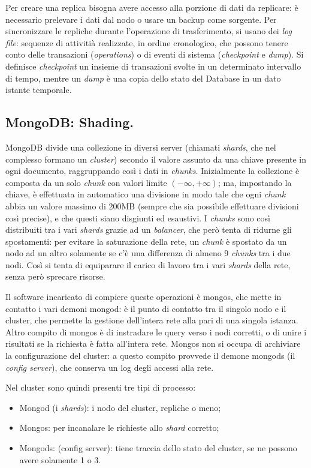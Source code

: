 \documentclass[a4page, 11pt]{article}
\begin{document}
Per creare una replica bisogna avere accesso alla porzione di dati da replicare: è necessario prelevare i dati dal nodo o usare un backup come sorgente.
Per sincronizzare le repliche durante l'operazione di trasferimento, si usano dei \textit{log file}: sequenze di attivitià realizzate, in ordine cronologico, che possono tenere conto delle transazioni (\textit{operations}) o di eventi di sistema (\textit{checkpoint} e \textit{dump}).
Si definisce \textit{checkpoint} un insieme di transazioni svolte in un determinato intervallo di tempo, mentre un \textit{dump} è una copia dello stato del Database in un dato istante temporale.

\subsection{MongoDB: Shading\cite{ScalingMongoDB}.}
MongoDB divide una collezione in diversi server (chiamati \textit{shards}, che nel complesso formano un \textit{cluster}) secondo il valore assunto da una chiave presente in ogni documento, raggruppando così i dati in \textit{chunks}.
Inizialmente la collezione è composta da un solo \textit{chunk} con valori limite $(-\infty, +\infty)$; ma, impostando la chiave, è effettuata in automatico una divisione in modo tale che ogni \textit{chunk} abbia un valore massimo di 200MB (sempre che sia possibile effettuare divisioni così precise), e che questi siano disgiunti ed esaustivi.
I \textit{chunks} sono così distribuiti tra i vari \textit{shards} grazie ad un \textit{balancer}, che però tenta di ridurne gli spostamenti: per evitare la saturazione della rete, un \textit{chunk} è spostato da un nodo ad un altro solamente se c'è una differenza di almeno 9 \textit{chunks} tra i due nodi.
Così si tenta di equiparare il carico di lavoro tra i vari \textit{shards} della rete, senza però sprecare risorse.

Il software incaricato di compiere queste operazioni è mongos, che mette in contatto i vari demoni mongod: è il punto di contatto tra il singolo nodo e il cluster, che permette la gestione dell'intera rete alla pari di una singola istanza.
Altro compito di mongos è di instradare le query verso i nodi corretti, o di unire i risultati se la richiesta è fatta all'intera rete.
Mongos non si occupa di archiviare la configurazione del cluster: a questo compito provvede il demone mongods (il \textit{config server}), che conserva un log degli accessi alla rete.

Nel cluster sono quindi presenti tre tipi di processo:
\begin{itemize}
\item Mongod (i \textit{shards}): i nodo del cluster, repliche o meno;
\item Mongos: per incanalare le richieste allo \textit{shard} corretto;
\item Mongods: (config server): tiene traccia dello stato del cluster, se ne possono avere solamente 1 o 3.
\end{itemize}
\end{document}
